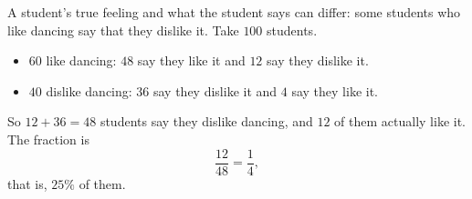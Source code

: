 A student's true feeling and what the student says can differ: some students who like dancing say that they dislike it. Take $100$ students.
\begin{itemize}
\item $60$ like dancing: $48$ say they like it and $12$ say they dislike it.
\item $40$ dislike dancing: $36$ say they dislike it and $4$ say they like it.
\end{itemize}
So $12+36=48$ students say they dislike dancing, and $12$ of them actually like it. The fraction is
\[
\dfrac{12}{48}=\boxed{\dfrac{1}{4}},
\]
that is, $25\%$ of them.

